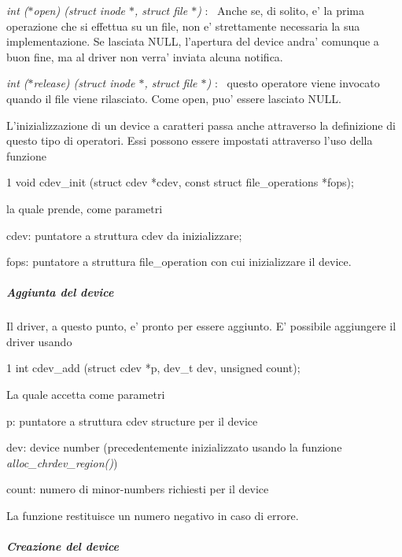 \begin{DoxyItemize}
\item {\itshape int ($\ast$open) (struct inode $\ast$, struct file $\ast$)} \+:~\newline
 Anche se, di solito, e' la prima operazione che si effettua su un file, non e' strettamente necessaria la sua implementazione. Se lasciata N\+U\+L\+L, l'apertura del device andra' comunque a buon fine, ma al driver non verra' inviata alcuna notifica.
\item {\itshape int ($\ast$release) (struct inode $\ast$, struct file $\ast$)} \+:~\newline
 questo operatore viene invocato quando il file viene rilasciato. Come open, puo' essere lasciato N\+U\+L\+L.
\end{DoxyItemize}

L'inizializzazione di un device a caratteri passa anche attraverso la definizione di questo tipo di operatori. Essi possono essere impostati attraverso l'uso della funzione 
\begin{DoxyCode}
1 void cdev\_init (struct cdev *cdev, const struct file\_operations *fops);
\end{DoxyCode}
 la quale prende, come parametri
\begin{DoxyItemize}
\item cdev\+: puntatore a struttura cdev da inizializzare;
\item fops\+: puntatore a struttura file\+\_\+operation con cui inizializzare il device.
\end{DoxyItemize}

\subparagraph*{Aggiunta del device}

Il driver, a questo punto, e' pronto per essere aggiunto. E' possibile aggiungere il driver usando 
\begin{DoxyCode}
1 int cdev\_add (struct cdev *p, dev\_t dev, unsigned count);
\end{DoxyCode}
 La quale accetta come parametri
\begin{DoxyItemize}
\item p\+: puntatore a struttura cdev structure per il device
\item dev\+: device number (precedentemente inizializzato usando la funzione {\itshape alloc\+\_\+chrdev\+\_\+region()})
\item count\+: numero di minor-\/numbers richiesti per il device
\end{DoxyItemize}

La funzione restituisce un numero negativo in caso di errore.

\subparagraph*{Creazione del device}

